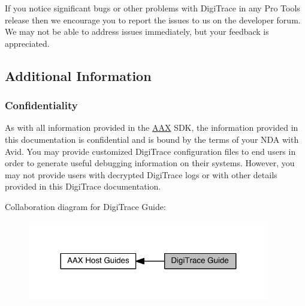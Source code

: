  If you notice significant bugs or other problems with Digi\+Trace in any Pro Tools release then we encourage you to report the issues to us on the developer forum. We may not be able to address issues immediately, but your feedback is appreciated.

\hypertarget{a00364_digitrace__additionalinformation}{}\subsection{Additional Information}\label{a00364_digitrace__additionalinformation}
\hypertarget{a00364_digitrace__additionalinformation__confidentiality}{}\subsubsection{Confidentiality}\label{a00364_digitrace__additionalinformation__confidentiality}
 As with all information provided in the \hyperlink{a00288}{A\+A\+X} S\+D\+K, the information provided in this documentation is confidential and is bound by the terms of your N\+D\+A with Avid. You may provide customized Digi\+Trace configuration files to end users in order to generate useful debugging information on their systems. However, you may not provide users with decrypted Digi\+Trace logs or with other details provided in this Digi\+Trace documentation.

 Collaboration diagram for Digi\+Trace Guide\+:
\nopagebreak
\begin{figure}[H]
\begin{center}
\leavevmode
\includegraphics[width=299pt]{a00364}
\end{center}
\end{figure}

